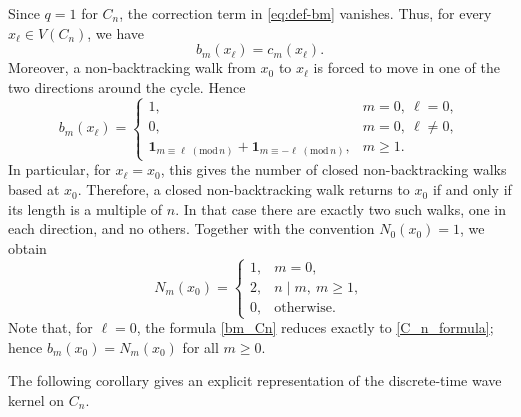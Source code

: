 \documentclass[reqno,10pt]{amsart}
\theoremstyle{definition}
\numberwithin{equation}{section}
\begin{document}
Since $q=1$ for $C_n$, the correction term in \eqref{eq:def-bm} vanishes.
Thus, for every $x_\ell\in V(C_n)$, we have
\[
b_m(x_\ell)=c_m(x_\ell).
\]
Moreover, a non-backtracking walk from $x_0$ to $x_\ell$ is forced to move
in one of the two directions around the cycle. Hence
\begin{equation}\label{bm_Cn}
    b_m(x_\ell)=
\begin{cases}
1, & m=0,\ \ell=0,\\
0, & m=0,\ \ell\ne0,\\
\mathbf 1_{m\equiv \ell\;(\mathrm{mod}\,n)}
+
\mathbf 1_{m\equiv -\ell\;(\mathrm{mod}\,n)}, & m\ge 1.
\end{cases}
\end{equation}
In particular, for $x_\ell=x_0$, this gives the number of closed
non-backtracking walks based at $x_0$. Therefore, a closed non-backtracking
walk returns to $x_0$ if and only if its length is a multiple of $n$.
In that case there are exactly two such walks, one in each direction, and no others.
Together with the convention $N_0(x_0)=1$, we obtain
\begin{equation} \label{C_n_formula}
    N_m(x_0)=
    \begin{cases}
1, & m=0,\\
2, & n\mid m,\ m\ge 1,\\
0, & \text{otherwise}.
\end{cases}
\end{equation}
Note that, for $\ell=0$, the formula \eqref{bm_Cn} reduces exactly to \eqref{C_n_formula}; hence $b_m(x_0)=N_m(x_0)$ for all $m\ge0$.

The following corollary gives an explicit representation of the discrete-time wave kernel on $C_n$.
\end{document}
